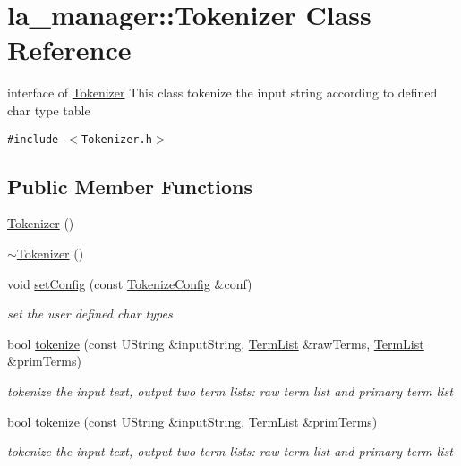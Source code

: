 \hypertarget{classla__manager_1_1Tokenizer}{
\section{la\_\-manager::Tokenizer Class Reference}
\label{classla__manager_1_1Tokenizer}
}
interface of \hyperlink{classla__manager_1_1Tokenizer}{Tokenizer} This class tokenize the input string according to defined char type table  


{\tt \#include $<$Tokenizer.h$>$}

\subsection*{Public Member Functions}
\begin{CompactItemize}
\item 
\hyperlink{classla__manager_1_1Tokenizer_6051a46c915e82456a0a228acffb20d0}{Tokenizer} ()
\item 
\hyperlink{classla__manager_1_1Tokenizer_25453b9cefb4836f76778bf5ee8f7af8}{$\sim$Tokenizer} ()
\item 
void \hyperlink{classla__manager_1_1Tokenizer_f5280871ecc5653b41a385bd45579d28}{setConfig} (const \hyperlink{classla__manager_1_1TokenizeConfig}{TokenizeConfig} \&conf)
\begin{CompactList}\small\item\em set the user defined char types \item\end{CompactList}\item 
bool \hyperlink{classla__manager_1_1Tokenizer_022320db1be5f36438cba009f23f8006}{tokenize} (const UString \&inputString, \hyperlink{namespacela__manager_06c0aab93982ee3ebc3ef9d0419e619a}{TermList} \&rawTerms, \hyperlink{namespacela__manager_06c0aab93982ee3ebc3ef9d0419e619a}{TermList} \&primTerms)
\begin{CompactList}\small\item\em tokenize the input text, output two term lists: raw term list and primary term list \item\end{CompactList}\item 
bool \hyperlink{classla__manager_1_1Tokenizer_85c27e7cbe95a00494c5be6e229ed5b6}{tokenize} (const UString \&inputString, \hyperlink{namespacela__manager_06c0aab93982ee3ebc3ef9d0419e619a}{TermList} \&primTerms)
\begin{CompactList}\small\item\em tokenize the input text, output two term lists: raw term list and primary term list \item\end{CompactList}\end{CompactItemize}
